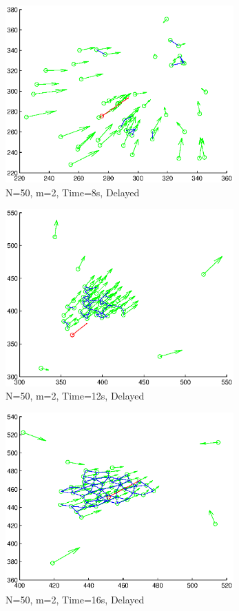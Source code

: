 \documentclass[10pt, conference]{IEEEtran}
\begin{document}
\begin{figure}[!h]
  \begin{center}
    \includegraphics[width=3.45in]{n50m2vmax100amax1000t08delay}
  \end{center}

  \caption{\small N=50, m=2, Time=8s, Delayed}
  \label{fig:n50m2vmax100amax1000t08delay}
\end{figure}

\begin{figure}[!h]
  \begin{center}
    \includegraphics[width=3.45in]{n50m2vmax100amax1000t12delay}
  \end{center}

  \caption{\small N=50, m=2, Time=12s, Delayed}
  \label{fig:n50m2vmax100amax1000t12delay}
\end{figure}

\begin{figure}[!h]
  \begin{center}
    \includegraphics[width=3.45in]{n50m2vmax100amax1000t16delay}
  \end{center}

  \caption{\small N=50, m=2, Time=16s, Delayed}
  \label{fig:n50m2vmax100amax1000t16delay}
\end{figure}
\end{document}
